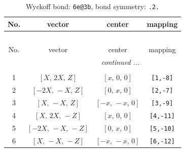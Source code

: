 \documentclass[fleqn,8pt]{jsarticle}
\begin{document}
\renewcommand{\arraystretch}{1.2}
\begin{longtable}{cccc}
\caption{Wyckoff bond: {\tt 6e@3b}, bond symmetry: {\tt .2.}}
 \\
 \hline \hline
No. & vector & center & mapping \\ \hline \endfirsthead

\multicolumn{3}{l}{\tablename\ \thetable{}} \\
 \hline \hline
No. & vector & center & mapping \\ \hline \endhead

 \hline \hline
\multicolumn{3}{r}{\footnotesize\it continued ...} \\ \endfoot

 \hline \hline
\multicolumn{3}{r}{} \\ \endlastfoot

1 & $\left[ X,\, 2 X,\, Z \right]$ & $\left[ x,\, 0,\, 0 \right]$ & {\tt [1,-8]} \\ \hline
2 & $\left[ - 2 X,\, - X,\, Z \right]$ & $\left[ 0,\, x,\, 0 \right]$ & {\tt [2,-7]} \\ \hline
3 & $\left[ X,\, - X,\, Z \right]$ & $\left[ - x,\, - x,\, 0 \right]$ & {\tt [3,-9]} \\ \hline
4 & $\left[ X,\, 2 X,\, - Z \right]$ & $\left[ x,\, 0,\, 0 \right]$ & {\tt [4,-11]} \\ \hline
5 & $\left[ - 2 X,\, - X,\, - Z \right]$ & $\left[ 0,\, x,\, 0 \right]$ & {\tt [5,-10]} \\ \hline
6 & $\left[ X,\, - X,\, - Z \right]$ & $\left[ - x,\, - x,\, 0 \right]$ & {\tt [6,-12]} \\
\end{longtable}
\renewcommand{\arraystretch}{1.2}
\end{document}
